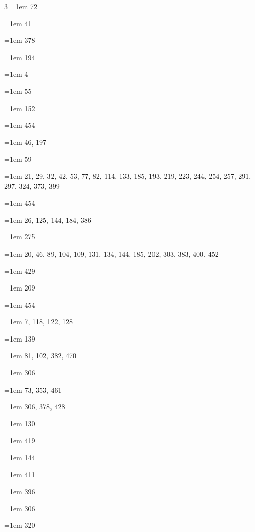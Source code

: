 \begin{multicols}{3}
\hangindent=1em  72\par
\hangindent=1em  41\par
\hangindent=1em  378\par
\hangindent=1em  194\par
\hangindent=1em  4\par
\hangindent=1em  55\par
\hangindent=1em  152\par
\hangindent=1em  454\par
\hangindent=1em  46, 197\par
\hangindent=1em  59\par
\hangindent=1em  21, 29, 32, 42, 53, 77, 82, 114, 133, 185, 193, 219, 223, 244, 254, 257, 291, 297, 324, 373, 399\par
\hangindent=1em  454\par
\hangindent=1em  26, 125, 144, 184, 386\par
\hangindent=1em  275\par
\hangindent=1em  20, 46, 89, 104, 109, 131, 134, 144, 185, 202, 303, 383, 400, 452\par
\hangindent=1em  429\par
\hangindent=1em  209\par
\hangindent=1em  454\par
\hangindent=1em  7, 118, 122, 128\par
\hangindent=1em  139\par
\hangindent=1em  81, 102, 382, 470\par
\hangindent=1em  306\par
\hangindent=1em  73, 353, 461\par
\hangindent=1em  306, 378, 428\par
\hangindent=1em  130\par
\hangindent=1em  419\par
\hangindent=1em  144\par
\hangindent=1em  411\par
\hangindent=1em  396\par
\hangindent=1em  306\par
\hangindent=1em  320\par

\end{multicols}
